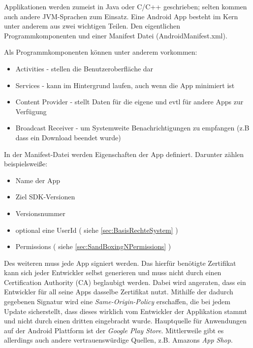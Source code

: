 \begin{flushleft}
	Applikationen werden zumeist in Java oder C/C++ geschrieben; selten kommen auch andere JVM-Sprachen zum Einsatz.
	Eine Android App besteht im Kern unter anderem aus zwei wichtigen Teilen. Den eigentlichen Programmkomponenten und einer Manifest Datei (AndroidManifest.xml).\\
\end{flushleft}
	Als Programmkomponenten können unter anderem vorkommen:
	\begin{itemize}\itemsep0pt
		\item Activities - stellen die Benutzeroberfläche dar
		\item Services - kann im Hintergrund laufen, auch wenn die App minimiert ist
		\item Content Provider - stellt Daten für die eigene und evtl für andere Apps zur Verfügung
		\item Broadcast Receiver - um Systemweite Benachrichtigungen zu empfangen (z.B dass ein Download beendet wurde)
	\end{itemize}
	In der Manifest-Datei werden Eigenschaften der App definiert. Darunter zählen beispielsweiße:
	\begin{itemize}\itemsep0pt
		\item Name der App
		\item Ziel SDK-Versionen
		\item Versionsnummer
		\item optional eine UserId ( siehe \ref*{sec:BasisRechteSystem} )
		\item Permissions ( siehe \ref*{sec:SandBoxingNPermissions} )
	\end{itemize}
	Des weiteren muss jede App signiert werden. Das hierfür benötigte Zertifikat kann sich jeder Entwickler selbst generieren und muss nicht durch einen Certification Authority (CA) beglaubigt werden. Dabei wird angeraten, dass ein Entwickler für all seine Apps dasselbe Zertifikat nutzt. Mithilfe der dadurch gegebenen Signatur wird eine \textit{Same-Origin-Policy} erschaffen, die bei jedem Update sicherstellt, dass dieses wirklich vom Entwickler der Applikation stammt und nicht durch einen dritten eingebracht wurde.
	Hauptquelle für Anwendungen auf der Android Plattform ist der \textit{Google Play Store}. Mittlerweile gibt es allerdings auch andere vertrauenswürdige Quellen, z.B. Amazons \textit{App Shop}.
	
